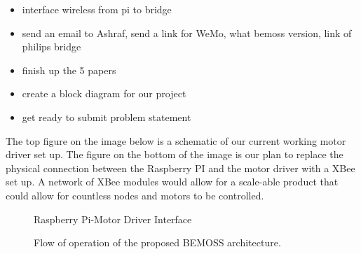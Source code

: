 \documentclass[fontsize=11pt, %
                             paper=letter, %
                             twoside, %
                             captions=tableheading,
                             index=totoc,
                             hyperref]{labbook}
\begin{document}
\begin{itemize}
    \item interface wireless from pi to bridge 
    \item send an email to Ashraf, send a link for WeMo, what bemoss version, link of philips bridge 
    \item finish up the 5 papers
    \item create a block diagram for our project
    \item get ready to submit problem statement 
\end{itemize}
The top figure on the image below is a schematic of our current working motor driver set up. The figure on the bottom of the image is our plan to replace the physical connection between the Raspberry PI and the motor driver with a XBee set up. A network of XBee modules would allow for a scale-able product that could allow for countless nodes and motors to be controlled. 
\begin{figure}
  \centering
  \caption{Raspberry Pi-Motor Driver Interface}
  \label{fig:RpiMDInterface}
\end{figure}



\begin{figure}
  \centering
  \caption{Flow of operation of the proposed BEMOSS architecture.}
  \label{fig:flowOfOperation}
\end{figure}
\end{document}
